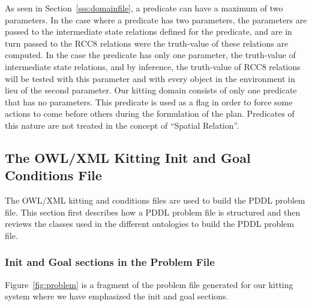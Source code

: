 \begin{itemize}
As seen in Section~\ref{sss:domainfile}, a predicate can have a maximum of two parameters. In the case where a predicate has two parameters, the parameters are passed to the intermediate state relations defined for the predicate, and are in turn passed to the RCC8 relations were the truth-value of these relations are computed. In the case the predicate has only one parameter, the truth-value of intermediate state relations, and by inference, the truth-value of RCC8 relations will be tested with this parameter and with every object in the environment in lieu of the second parameter. Our kitting domain consists of only one predicate that has no parameters. This predicate is used as a flag in order to force some actions to come before others during the formulation of the plan. Predicates of this nature are not treated in the concept of ``Spatial Relation''.
\end{itemize}



\subsection{The OWL/XML Kitting Init and Goal Conditions File} \label{owlinitgoal}
The OWL/XML kitting  and  conditions files are used to build the PDDL problem file. This section first describes how a PDDL problem file is structured and then reviews the classes used in the different ontologies to build the PDDL problem file.

\subsubsection{Init and Goal sections in the Problem File}
Figure~\ref{fig:problem} is a fragment of the problem file generated for our kitting system where we have emphasized the init and goal sections.

